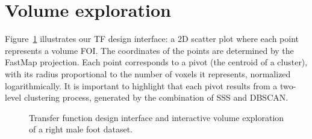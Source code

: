 \section{Volume exploration}
\label{sect:volume-exploration}

Figure~\ref{fig:tf-design-example} illustrates our TF design interface: a 2D scatter plot where each point represents a volume FOI. The coordinates of the points are determined by the FastMap projection. Each point corresponds to a pivot (the centroid of a cluster), with its radius proportional to the number of voxels it represents, normalized logarithmically. It is important to highlight that each pivot results from a two-level clustering process, generated by the combination of SSS and DBSCAN.

\begin{figure}[htb!]
    \centering
    \hfill
    \caption{Transfer function design interface and interactive volume exploration of a right male foot dataset.}
    \label{fig:tf-design-example}
\end{figure}

